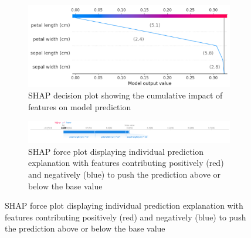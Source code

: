 \begin{figure}[htbp]
    \centering
    
    \begin{subfigure}[c]{0.385\textwidth}
        \centering
        \includegraphics[width=\textwidth]{images/shapDecisionPlot.png}
        \caption{SHAP decision plot showing the cumulative impact of features on model prediction}
        \label{fig:shap_decision}
    \end{subfigure}
    \hfill
    \begin{subfigure}[c]{0.385\textwidth}
        \centering
        \includegraphics[width=\textwidth]{images/shapForcePlot.png}
        \caption{SHAP force plot displaying individual prediction explanation with features contributing positively (red) and negatively (blue) to push the prediction above or below the base value}
        \label{fig:shap_force}
    \end{subfigure}
    
    \vspace{0.5cm}
    

\end{figure}

